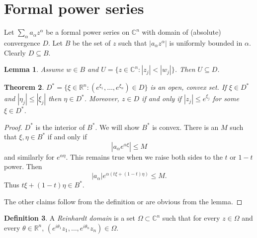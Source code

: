 \documentclass[12pt]{report}
\newcommand{\RR}{\mathbb{R}}
\newcommand{\CC}{\mathbb{C}}
\newcommand{\dfn}[1]{\emph{#1}\index{#1}}
\newtheorem{theorem}{Theorem}[chapter]
\newtheorem{lemma}[theorem]{Lemma}
\theoremstyle{definition}
\newtheorem{definition}[theorem]{Definition}
\begin{document}
\section{Formal power series}
Let $\sum_\alpha a_\alpha z^\alpha$ be a formal power series on $\CC^n$ with domain of (absolute) convergence $D$. Let $B$ be the set of $z$ such that $|a_\alpha z^\alpha|$ is uniformly bounded in $\alpha$. Clearly $D \subseteq B$.
\begin{lemma}
    Assume $w \in B$ and $U = \{z \in \CC^n: |z_j| < |w_j|\}$. Then $U \subseteq D$. 
\end{lemma}
\begin{theorem}
    $D^* = \{\xi \in \RR^n: (e^{\xi_1}, \dots, e^{\xi_n}) \in D\}$ is an open, convex set. If $\xi \in D^*$ and $|\eta_j| \leq |\xi_j|$ then $\eta \in D^*$. Moreover, $z \in D$ if and only if $|z_j| \leq e^{\xi_j}$ for some $\xi \in D^*$.
\end{theorem}
\begin{proof}
    $D^*$ is the interior of $B^*$. We will show $B^*$ is convex. There is an $M$ such that $\xi, \eta \in B^*$ if and only if
    $$|a_\alpha e^{\alpha\xi}| \leq M$$
    and similarly for $e^{\alpha\eta}$. This remains true when we raise both sides to the $t$ or $1-t$ power. Then
    $$|a_\alpha|e^{\alpha(t\xi + (1-t)\eta)} \leq M.$$
    Thus $t\xi + (1-t)\eta \in B^*$.

    The other claims follow from the definition or are obvious from the lemma.
\end{proof}
\begin{definition}
    A \dfn{Reinhardt domain} is a set $\Omega \subset \CC^n$ such that for every $z \in \Omega$ and every $\theta \in \RR^n$, $(e^{i\theta_1} z_1, \dots, e^{i\theta_n} z_n) \in \Omega$.
\end{definition}
\end{document}
